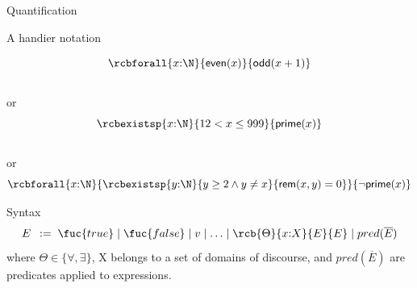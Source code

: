 \documentclass{beamer}
\def\true{\fuc{true}}
\def\false{\fuc{false}}
\def\e{\mathbin{\wedge}}
\def\ou{\mathbin{\vee}}
\begin{document}
\begin{slide}{Quantification}

\begin{block}{A handier notation}

$$
\rcbforall{x{:}\N}{\mathsf{even}(x)}{\mathsf{odd}(x+1)}
$$
\\[-5mm]
or
$$
\rcbexistsp{x{:}\N}{12 < x \leq 999}{\mathsf{prime}(x)}
$$
\\[-5mm]
or
\\[-5mm]
$$
\rcbforall{x{:}\N}{\rcbexistsp{y{:}\N}{y \geq 2 \e y \neq x}{\mathsf{rem}(x,y) = 0}}{\neg \mathsf{prime}(x)}
$$
\end{block}

\begin{block}{Syntax}
~\\[-11mm]
$$ 
E\; \::=\; \true \mid \false \mid v \mid %
           \ldots \mid \rcb{\Theta}{x{:}X}{E}{E} \mid pred(\overline{E})
$$
\noindent
where $\Theta \in \{\forall,\exists\}$, X belongs to a set of domains of discourse, and $pred(\overline{E})$ are predicates applied to expressions.
\end{block}
\end{slide}







\end{document}
